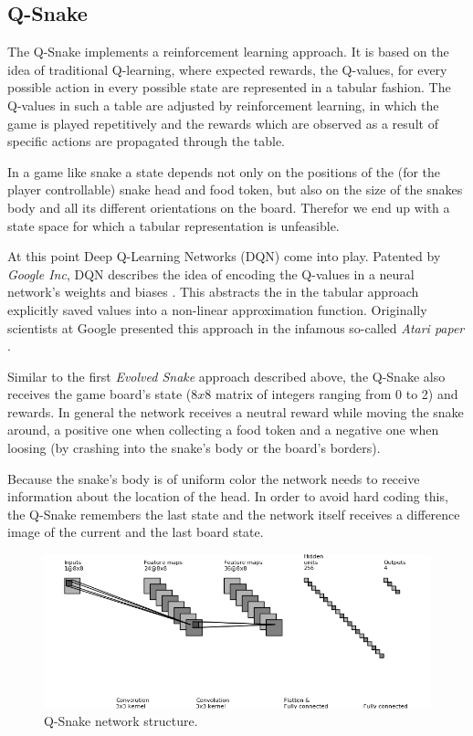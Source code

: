 \documentclass[a4paper]{article}
\begin{document}
\subsection{Q-Snake}
The Q-Snake implements a reinforcement learning approach. It is based on the idea of traditional Q-learning, where expected rewards, the Q-values, for every possible action in every possible state are represented in a tabular fashion. The Q-values in such a table are adjusted by reinforcement learning, in which the game is played repetitively and the rewards which are observed as a result of specific actions are propagated through the table.

In a game like snake a state depends not only on the positions of the (for the player controllable) snake head and food token, but also on the size of the snakes body and all its different orientations on the board. Therefor we end up with a state space for which a tabular representation is unfeasible.

At this point Deep Q-Learning Networks (DQN) come into play. Patented by \textit{Google Inc}, DQN describes the idea of encoding the Q-values in a neural network's weights and biases \cite{mnih2016}. This abstracts the in the tabular approach explicitly saved values into a non-linear approximation function. Originally scientists at Google presented this approach in the infamous so-called \textit{Atari paper} \cite{mnih2013}.

Similar to the first \textit{Evolved Snake} approach described above, the Q-Snake also receives the game board's state ($8x8$ matrix of integers ranging from 0 to 2) and rewards. In general the network receives a neutral reward while moving the snake around, a positive one when collecting a food token and a negative one when loosing (by crashing into the snake's body or the board's borders). 

Because the snake's body is of uniform color the network needs to receive information about the location of the head. In order to avoid hard coding this, the Q-Snake remembers the last state and the network itself receives a difference image of the current and the last board state.

\begin{figure}
  \centering
  \includegraphics[width=\textwidth]{convnet_fig}
  \caption{\label{fig:q_snake_network}Q-Snake network structure.}
\end{figure}
\end{document}
